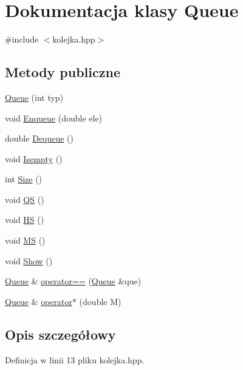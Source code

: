 \hypertarget{class_queue}{\section{Dokumentacja klasy Queue}
\label{class_queue}
}


{\ttfamily \#include $<$kolejka.\-hpp$>$}

\subsection*{Metody publiczne}
\begin{DoxyCompactItemize}
\item 
\hyperlink{class_queue_af1fd9bf4e7e72c4393f70d6cc6510e72}{Queue} (int typ)
\item 
void \hyperlink{class_queue_ad79218b6296d87515f0a487764c44111}{Enqueue} (double ele)
\item 
double \hyperlink{class_queue_af6a908c687baa28ac3237dcf22c1ba13}{Dequeue} ()
\item 
void \hyperlink{class_queue_ae671ac7c20b47b9a57eb008e1b946bfe}{Isempty} ()
\item 
int \hyperlink{class_queue_a2b28fe3446577261546f74b7bbe3ccc6}{Size} ()
\item 
void \hyperlink{class_queue_a05d02f07f4803b68cfb31c5e009b9fcc}{Q\-S} ()
\item 
void \hyperlink{class_queue_a08133cee98c6aeb1743b6dbd3e5dda91}{H\-S} ()
\item 
void \hyperlink{class_queue_aff513390c08fdd376577704be1d831c9}{M\-S} ()
\item 
void \hyperlink{class_queue_a2f80b1ea8c0af424d0153af7563e1c34}{Show} ()
\item 
\hyperlink{class_queue}{Queue} \& \hyperlink{class_queue_aef9c898949be023f99190e5f45996587}{operator==} (\hyperlink{class_queue}{Queue} \&que)
\item 
\hyperlink{class_queue}{Queue} \& \hyperlink{class_queue_a1b806694ad653ed3dd0fc48a216f97bc}{operator$\ast$} (double M)
\end{DoxyCompactItemize}


\subsection{Opis szczegółowy}


Definicja w linii 13 pliku kolejka.\-hpp.




